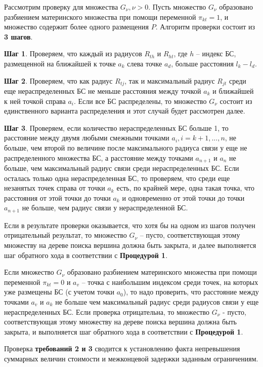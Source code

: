 Рассмотрим проверку для  множества  $G_\nu, \nu>0$. Пусть множество $G_\nu$  образовано разбиением материнского множества при помощи переменной $\pi_{kt}=1$, и множество содержит более одного размещения $P$.
Алгоритм проверки состоит из \textbf{3 шагов}.

\textbf{Шаг 1}. Проверяем, что каждый из радиусов $R_{th}$ и $R_{ht}$, где $h$ – индекс БС, размещенной на ближайшей к точке $a_k$ слева точке $a_d$, больше расстояния $l_k-l_d$. 

\textbf{Шаг 2}. Проверяем, что как радиус $R_{tj}$, так и максимальный радиус $R_{jt}$ среди еще нераспределенных БС не меньше расстояния между точкой $a_k$ и ближайшей к ней точкой справа $a_i$.  Если все БС распределены, то множество $G_\nu$ состоит из единственного варианта распределения и этот случай будет рассмотрен далее.

\textbf{Шаг 3}. Проверяем, если количество нераспределенных БС больше 1, то расстояние между двумя любыми смежными точками $a_i, i=k+1,...,n$, не больше, чем второй по величине после максимального радиуса связи у еще не распределенного множества БС, а расстояние между точками $a_{n+1}$ и $a_n$  не больше, чем максимальный радиус связи среди нераспределенных БС. Если осталась только одна нераспределенная БС, то проверяем, что среди еще незанятых точек справа от точки $a_k$  есть, по крайней мере, одна такая точка, что расстояния от этой точки до точки $a_k$ и одновременно от этой точки до точки $a_{n+1}$ не больше, чем  радиус связи у нераспределенной БС.

Если в результате проверки оказывается, что хотя бы на одном из шагов получен отрицательный результат, то множество $G_\nu$ -- пусто, соответствующая этому множеству на дереве поиска вершина должна быть закрыта, и далее выполняется шаг обратного хода в соответствии с \textbf{Процедурой 1}.

Если множество $G_\nu$ образовано разбиением материнского множества при помощи переменной $\pi_{kt}=0$ и $a_v$ -- точка с наибольшим индексом среди точек, на которых уже размещены БС (с учетом точки $a_0$), то надо проверить, что расстояние между точками $a_v$ и $a_k$ не больше чем максимальный радиус среди радиусов связи у еще нераспределенных БС. Если проверка отрицательна, то множество $G_\nu$  - пусто, соответствующая этому множеству на дереве поиска вершина должна быть закрыта, и выполняется шаг обратного хода в соответствии с \textbf{Процедурой 1}.

Проверка \textbf{требований 2 и 3} сводится к установлению факта непревышения суммарных величин стоимости и межконцевой задержки заданным ограничениям.

